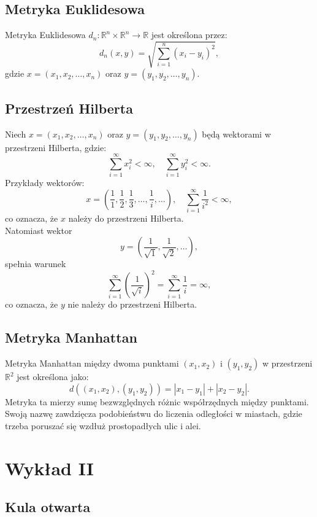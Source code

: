 \documentclass{article}
\theoremstyle{definition}
\theoremstyle{definition}
\theoremstyle{definition}
\theoremstyle{definition}
\theoremstyle{definition}
\theoremstyle{definition}
\theoremstyle{definition}
\begin{document}
\subsection{Metryka Euklidesowa}

Metryka Euklidesowa \( d_n: \mathbb{R}^n \times \mathbb{R}^n \rightarrow \mathbb{R} \) jest określona przez:
\[
d_n(x,y) = \sqrt{\sum_{i=1}^{n} (x_i - y_i)^2},
\]
gdzie \( x = (x_1, x_2, \dots, x_n) \) oraz \( y = (y_1, y_2, \dots, y_n) \).

\subsection{Przestrzeń Hilberta}

Niech \( x = (x_1, x_2, \dots, x_n) \) oraz \( y = (y_1, y_2, \dots, y_n) \) będą wektorami w przestrzeni Hilberta, gdzie:
\[
\sum_{i=1}^{\infty} x_i^2 < \infty, \quad \sum_{i=1}^{\infty} y_i^2 < \infty.
\]
Przykłady wektorów:
\[
x = \left(\frac{1}{1}, \frac{1}{2}, \frac{1}{3}, \dots, \frac{1}{i}, \dots \right), \quad \sum_{i=1}^{\infty} \frac{1}{i^2} < \infty,
\]
co oznacza, że \( x \) należy do przestrzeni Hilberta.\\
Natomiast wektor
\[
y = \left(\frac{1}{\sqrt{1}}, \frac{1}{\sqrt{2}}, \dots \right),
\]
spełnia warunek
\[
\sum_{i=1}^{\infty} \left(\frac{1}{\sqrt{i}}\right)^2 = \sum_{i=1}^{\infty} \frac{1}{i} = \infty,
\]
co oznacza, że \( y \) nie należy do przestrzeni Hilberta.

\subsection{Metryka Manhattan}

Metryka Manhattan między dwoma punktami \( (x_1, x_2) \) i \( (y_1, y_2) \) w przestrzeni \( \mathbb{R}^2 \) jest określona jako:
\[
d((x_1, x_2), (y_1, y_2)) = |x_1 - y_1| + |x_2 - y_2|.
\]
Metryka ta mierzy sumę bezwzględnych różnic współrzędnych między punktami.
Swoją nazwę zawdzięcza podobieństwu do liczenia odległości w miastach, gdzie trzeba poruszać się wzdłuż prostopadłych ulic i alei.

\section{Wykład II}

\subsection{Kula otwarta}
\end{document}
